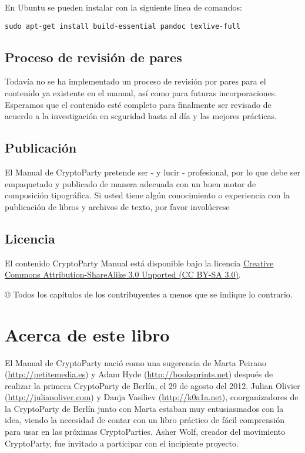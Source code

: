 \documentclass[10pt,a5paper,twoside,,]{book}
\begin{document}
En Ubuntu se pueden instalar con la siguiente línea de comandos:

\begin{verbatim}
sudo apt-get install build-essential pandoc texlive-full
\end{verbatim}

\section{Proceso de revisión de
pares}\label{proceso-de-revisiuxf3n-de-pares}

Todavía no se ha implementado un proceso de revisión por pares para el
contenido ya existente en el manual, así como para futuras
incorporaciones. Esperamos que el contenido esté completo para
finalmente ser revisado de acuerdo a la investigación en seguridad hasta
al día y las mejores prácticas.

\section{Publicación}\label{publicaciuxf3n}

El Manual de CryptoParty pretende ser - y lucir - profesional, por lo
que debe ser empaquetado y publicado de manera adecuada con un buen
motor de composición tipográfica. Si usted tiene algún conocimiento o
experiencia con la publicación de libros y archivos de texto, por favor
involúcrese

\section{Licencia}\label{licencia}

El contenido CryptoParty Manual está disponible bajo la licencia
\href{https://creativecommons.org/licenses/by-sa/3.0/}{Creative Commons
Attribution-ShareAlike 3.0 Unported (CC BY-SA 3.0)}.

© Todos los capítulos de los contribuyentes a menos que se indique lo
contrario.

\chapter{Acerca de este libro}\label{acerca-de-este-libro}

El Manual de CryptoParty nació como una sugerencia de Marta Peirano
(\href{http://petitmedia.es}{http://petitemedia.es}) y Adam Hyde
(\url{http://booksprints.net}) después de realizar la primera
CryptoParty de Berlín, el 29 de agosto del 2012. Julian Olivier
\href{http://julianoliver.com}{(http://julianoliver.com}) y Danja
Vasiliev (\href{http://koala.net}{http://k0a1a.net}), coorganizadores de
la CryptoParty de Berlín junto con Marta estaban muy entusiasmados con
la idea, viendo la necesidad de contar con un libro práctico de fácil
comprensión para usar en las próximas CryptoParties. Asher Wolf, creador
del movimiento CryptoParty, fue invitado a participar con el incipiente
proyecto.
\end{document}
